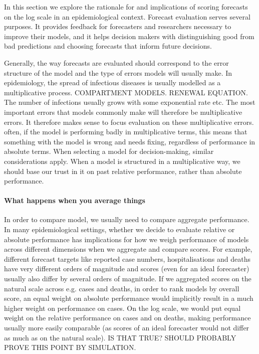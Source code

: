 \documentclass{article}
\begin{document}
In this section we explore the rationale for and implications of scoring forecasts on the log scale in an epidemiological context. Forecast evaluation serves several purposes. It provides feedback for forecasters and researchers necessary to improve their models, and it helps decision makers with distinguishing good from bad predictions and choosing forecasts that inform future decisions. 

Generally, the way forecasts are evaluated should correspond to the error structure of the model and the type of errors models will usually make. In epidemiology, the spread of infectious diseases is usually modelled as a multiplicative process. COMPARTMENT MODELS. RENEWAL EQUATION. The number of infections usually grows with some exponential rate etc. The most important errors that models commonly make will therefore be multiplicative errors. It therefore makes sense to focus evaluation on these multiplicative errors. often, if the model is performing badly in multiplicative terms, this means that something with the model is wrong and needs fixing, regardless of performance in absolute terms. When selecting a model for decision-making, similar considerations apply. When a model is structured in a multiplicative way, we should base our trust in it on past relative performance, rather than absolute performance. 

\paragraph{What happens when you average things}
In order to compare model, we usually need to compare aggregate performance. In many epidemiological settings, whether we decide to evaluate relative or absolute performance has implications for how we weigh performance of models across different dimensions when we aggregate and compare scores. For example, different forecast targets like reported case numbers, hospitalisations and deaths have very different orders of magnitude and scores (even for an ideal forecaster) usually also differ by several orders of magnitude. If we aggregated scores on the natural scale across e.g. cases and deaths, in order to rank models by overall score, an equal weight on absolute performance would implicitly result in a much higher weight on performance on cases. On the log scale, we would put equal weight on the relative performance on cases and on deaths, making performance usually more easily comparable (as scores of an ideal forecaster would not differ as much as on the natural scale). 
IS THAT TRUE? SHOULD PROBABLY PROVE THIS POINT BY SIMULATION. 
\end{document}
